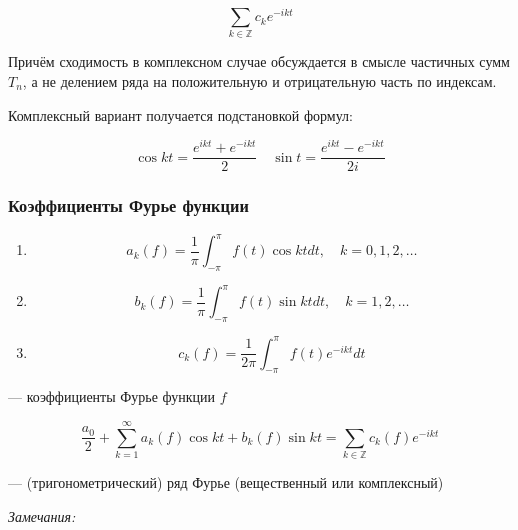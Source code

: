 \documentclass{article}
\begin{document}
\[\sum_{k \in \mathbb{Z}} c_k e^{-ikt}\]

Причём сходимость в комплексном случае обсуждается в смысле частичных сумм $T_n$, а не делением ряда на положительную и отрицательную часть по индексам.

Комплексный вариант получается подстановкой формул:

\[\cos kt = \frac{e^{ikt} + e^{-ikt}}{2} \quad \sin t = \frac{e^{ikt} - e^{-ikt}}{2i}\]

\subsubsection{Коэффициенты Фурье функции}

\begin{enumerate}
    \item \[a_k(f) = \frac{1}{\pi} \int_{-\pi}^{\pi} f(t) \cos kt dt, \quad k = 0, 1, 2, \ldots\]
    \item \[b_k(f) = \frac{1}{\pi} \int_{-\pi}^{\pi} f(t) \sin kt dt, \quad k = 1, 2, \ldots\]
    \item \[c_k(f) = \frac{1}{2\pi} \int_{-\pi}^{\pi} f(t) e^{-ikt} dt\]
\end{enumerate}

--- коэффициенты Фурье функции $f$

\[\frac{a_0}{2} + \sum_{k = 1}^{\infty} a_k(f) \cos kt + b_k(f) \sin kt = \sum_{k \in \mathbb{Z}} c_k(f) e^{-ikt}\]

--- (тригонометрический) ряд Фурье (вещественный или комплексный)

\textit{Замечания:}
\end{document}
